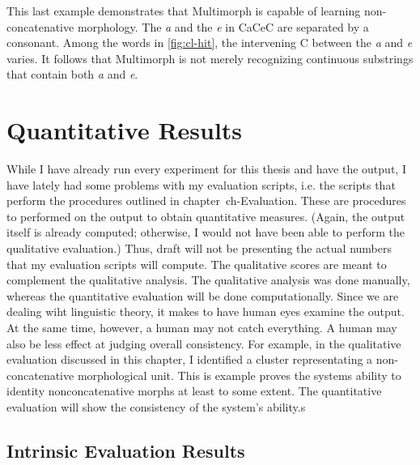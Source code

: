 This last example demonstrates that Multimorph is capable of learning non-concatenative morphology. The \textit{a} and the \textit{e} in CaCeC are separated by a consonant. Among the words in \ref{fig:cl-hit}, the intervening C between the \textit{a} and \textit{e} varies. It follows that Multimorph is not merely recognizing continuous substrings that contain both \textit{a} and \textit{e}.



\section{Quantitative Results}

While I have already run every experiment for this thesis and have the output, I have lately had some problems with my evaluation scripts, i.e. the scripts that perform the procedures outlined in chapter~{ch-Evaluation}. These are procedures to performed on the output to obtain quantitative measures. (Again, the output itself is already computed; otherwise, I would not have been able to perform the qualitative evaluation.) 
Thus, draft will not be presenting the actual numbers that my evaluation scripts will compute. The qualitative scores are meant to complement the qualitative analysis. The qualitative analysis was done manually, whereas the quantitative evaluation will be done computationally. Since we are dealing wiht linguistic theory, it makes to have human eyes examine the output. At the same time, however, a human may not catch everything. A human may also be less effect at judging overall consistency. For example, in the qualitative evaluation discussed in this chapter, I identified a cluster representating a non-concatenative morphological unit. This is example proves the systems ability to identity nonconcatenative morphs at least to some extent. The quantitative evaluation will show the consistency of the system's ability.s
\subsection{Intrinsic Evaluation Results}

